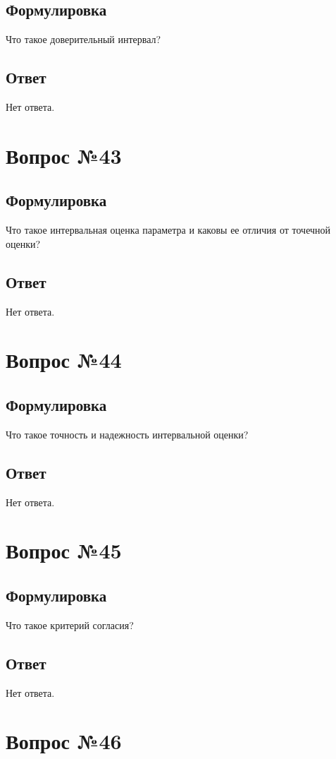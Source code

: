 \documentclass[a4]{article}
\begin{document}
	\subsection*{Формулировка}
	Что такое доверительный интервал?
	\subsection*{Ответ}
	Нет ответа.
	
	\section{Вопрос №43}
	\subsection*{Формулировка}
	Что такое интервальная оценка параметра и каковы ее отличия от точечной оценки?
	\subsection*{Ответ}
	Нет ответа.
	
	\section{Вопрос №44}
	\subsection*{Формулировка}
	Что такое точность и надежность интервальной оценки?	
	\subsection*{Ответ}
	Нет ответа.
	
	\section{Вопрос №45}
	\subsection*{Формулировка}
	Что такое критерий согласия?
	\subsection*{Ответ}
	Нет ответа.
	
	\section{Вопрос №46}
\end{document}
